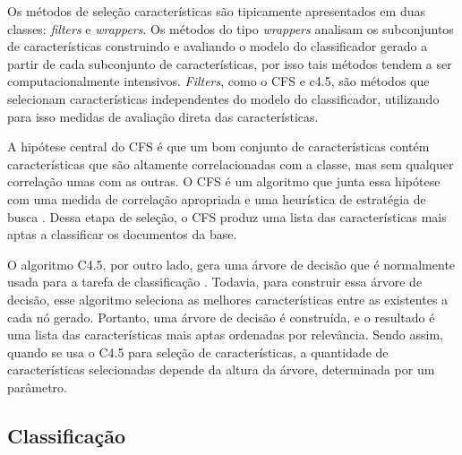 \documentclass[template.tex]{subfiles}
\begin{document}


Os métodos de seleção características são tipicamente apresentados em duas classes: \textit{filters} e \textit{wrappers}\cite{guyon2003introduction}. Os métodos do tipo \textit{wrappers} analisam os subconjuntos de características construindo e avaliando o modelo do classificador gerado a partir de cada subconjunto de características, por isso tais métodos  tendem a ser computacionalmente intensivos. \textit{Filters}, como o CFS e c4.5, são métodos que selecionam características independentes do modelo do classificador, utilizando para isso medidas de avaliação direta das características.

A hipótese central do CFS é que um bom conjunto de características contém características que são altamente correlacionadas com a classe, mas sem qualquer correlação umas com as outras. O CFS é um algoritmo que junta essa hipótese com uma medida de correlação apropriada e uma heurística de estratégia de busca \cite{hall1999correlation}. Dessa etapa de seleção, o CFS produz uma lista das características mais aptas a classificar os documentos da base. 

O algoritmo C4.5, por outro lado, gera uma árvore de decisão que é normalmente usada para a tarefa de classificação \cite{quinlan19934}. Todavia, para construir essa árvore de decisão, esse algoritmo seleciona as melhores características entre as existentes a cada nó gerado. Portanto, uma árvore de decisão é construída, e o resultado é uma lista das características mais aptas ordenadas por relevância. Sendo assim, quando se usa o C4.5 para seleção de características, a quantidade de características selecionadas depende da altura da árvore, determinada por um parâmetro.

\subsection{Classificação}

%
%
%
%
%
\end{document}
